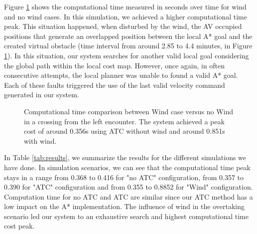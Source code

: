         Figure \ref{fig:plot_ov_w_vs_wind_CT} shows the computational time measured in seconds over time for wind and no wind cases. In this simulation, we achieved a higher computational time peak. This situation happened, when disturbed by the wind, the \ac{AV} occupied positions that generate an overlapped position between the local A* goal and the created virtual obstacle (time interval from around 2.85 to 4.4 minutes, in Figure \ref{fig:plot_ov_w_vs_wind_CT}). In this situation, our system searches for another valid local goal considering the global path within the local cost map. However, once again, in often consecutive attempts, the local planner was unable to found a valid A* goal. Each of these faults triggered the use of the last valid velocity command generated in our system.
        
        \begin{figure}[H]
            \centering
            
            \caption{Computational time comparison between Wind case versus no Wind in a crossing from the left encounter. The system achieved a peak cost of around 0.356s using \ac{ATC} without wind and around 0.851s with wind.}
            \label{fig:plot_ov_w_vs_wind_CT}
        \end{figure}
        
        
        In Table \ref{tab:results}, we summarize the results for the different simulations we have done. In simulation scenarios, we can see that the computational time peak stays in a range from 0.368 to 0.416 for "no \ac{ATC}" configuration, from 0.357 to 0.390 for "\ac{ATC}" configuration and from 0.355 to 0.8852 for "Wind" configuration. Computation time for no \ac{ATC} and \ac{ATC} are similar since our \ac{ATC} method has a low impact on the A* implementation. The influence of wind in the overtaking scenario led our system to an exhaustive search and highest computational time cost peak. 
        
        
